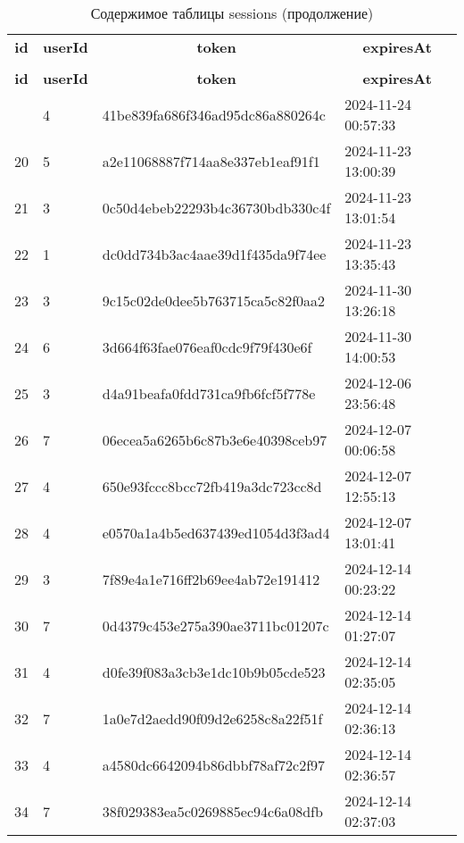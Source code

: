%
%
 \begin{longtable}{|l|l|l|l|} 
 \hline \endhead \hline \endfoot \hline 
 \caption{Содержимое таблицы sessions} \label{tab:sessions-data} \\\hline \multicolumn{1}{|c|}{\textbf{id}} & \multicolumn{1}{|c|}{\textbf{userId}} & \multicolumn{1}{|c|}{\textbf{token}} & \multicolumn{1}{|c|}{\textbf{expiresAt}} \\ \hline \hline  \endfirsthead 
\caption{Содержимое таблицы sessions (продолжение)} \\ \hline \multicolumn{1}{|c|}{\textbf{id}} & \multicolumn{1}{|c|}{\textbf{userId}} & \multicolumn{1}{|c|}{\textbf{token}} & \multicolumn{1}{|c|}{\textbf{expiresAt}} \\ \hline \hline \endhead \endfoot
19 & 4 & 41be839fa686f346ad95dc86a880264c & 2024-11-24 00:57:33 \\ \hline 
20 & 5 & a2e11068887f714aa8e337eb1eaf91f1 & 2024-11-23 13:00:39 \\ \hline 
21 & 3 & 0c50d4ebeb22293b4c36730bdb330c4f & 2024-11-23 13:01:54 \\ \hline 
22 & 1 & dc0dd734b3ac4aae39d1f435da9f74ee & 2024-11-23 13:35:43 \\ \hline 
23 & 3 & 9c15c02de0dee5b763715ca5c82f0aa2 & 2024-11-30 13:26:18 \\ \hline 
24 & 6 & 3d664f63fae076eaf0cdc9f79f430e6f & 2024-11-30 14:00:53 \\ \hline 
25 & 3 & d4a91beafa0fdd731ca9fb6fcf5f778e & 2024-12-06 23:56:48 \\ \hline 
26 & 7 & 06ecea5a6265b6c87b3e6e40398ceb97 & 2024-12-07 00:06:58 \\ \hline 
27 & 4 & 650e93fccc8bcc72fb419a3dc723cc8d & 2024-12-07 12:55:13 \\ \hline 
28 & 4 & e0570a1a4b5ed637439ed1054d3f3ad4 & 2024-12-07 13:01:41 \\ \hline 
29 & 3 & 7f89e4a1e716ff2b69ee4ab72e191412 & 2024-12-14 00:23:22 \\ \hline 
30 & 7 & 0d4379c453e275a390ae3711bc01207c & 2024-12-14 01:27:07 \\ \hline 
31 & 4 & d0fe39f083a3cb3e1dc10b9b05cde523 & 2024-12-14 02:35:05 \\ \hline 
32 & 7 & 1a0e7d2aedd90f09d2e6258c8a22f51f & 2024-12-14 02:36:13 \\ \hline 
33 & 4 & a4580dc6642094b86dbbf78af72c2f97 & 2024-12-14 02:36:57 \\ \hline 
34 & 7 & 38f029383ea5c0269885ec94c6a08dfb & 2024-12-14 02:37:03 \\ \hline 

\end{longtable}
